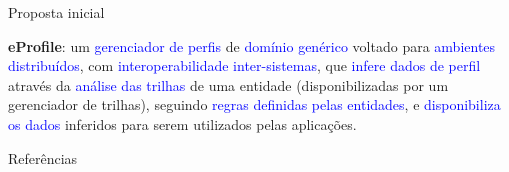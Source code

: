 \documentclass{beamer}
\begin{document}

\begin{frame}{Proposta inicial}

\textbf{eProfile}: um \textcolor{blue}{gerenciador de perfis} de \textcolor{blue}{domínio genérico} voltado para \textcolor{blue}{ambientes distribuídos}, com \textcolor{blue}{interoperabilidade inter-sistemas}, que \textcolor{blue}{infere dados de perfil} através da \textcolor{blue}{análise das trilhas} de uma entidade (disponibilizadas por um gerenciador de trilhas), seguindo \textcolor{blue}{regras definidas pelas entidades}, e \textcolor{blue}{disponibiliza os dados} inferidos para serem utilizados pelas aplicações.

\end{frame}


\begin{frame}[allowframebreaks]{Referências}




\end{frame}
\end{document}
